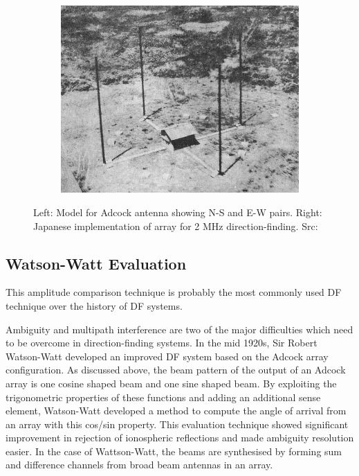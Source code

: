 \begin{figure}
\begin{subfigure}[b]{0.6\textwidth}
    \includegraphics[width=\textwidth]{./img/lit_review/adcock_implementation}
  \end{subfigure}
  \caption{Left: Model for Adcock antenna showing N-S and E-W pairs. Right: Japanese implementation of array for 2 MHz direction-finding. Src: \cite{japanesecommunications}}
  \label{fig:lit_adcock_array}
\end{figure}


\subsection{Watson-Watt Evaluation}
This amplitude comparison technique is probably the most commonly used DF technique over the history of DF systems\cite{poisel2012electronic}.

Ambiguity and multipath interference are two of the major difficulties which need to be overcome in direction-finding systems. 
In the mid 1920s, Sir Robert Watson-Watt developed an improved DF system based on the Adcock array configuration. 
As discussed above, the beam pattern of the output of an Adcock array is one cosine shaped beam and one sine shaped beam. By exploiting the trigonometric properties of these functions and adding an additional sense element, Watson-Watt developed a method to compute the angle of arrival from an array with this cos/sin property. 
This evaluation technique showed significant improvement in rejection of ionospheric reflections and made ambiguity resolution easier.
In the case of Wattson-Watt, the beams are synthesised by forming sum and difference channels from broad beam antennas in an array.

